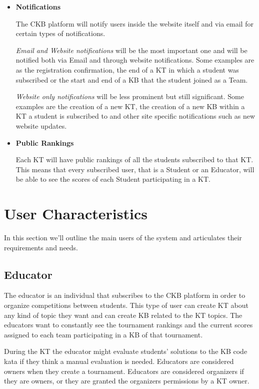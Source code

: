 \documentclass[11pt]{report}
\begin{document}
\begin{itemize}
    \item \textbf{Notifications}

    The CKB platform will notify users inside the website itself and via email for certain types of 
    notifications.

    \emph{Email and Website notifications} will be the most important one and will be notified both via Email and through website notifications.
    Some examples are as the registration confirmation, the end of a KT in which a student was subscribed
    or the start and end of a KB that the student joined as a Team.

    \emph{Website only notifications} will be less prominent but still significant.
    Some examples are the creation of a new KT, the creation of a new KB within a KT a student is subscribed to and other site
    specific notifications such as new website updates.

    \item \textbf{Public Rankings}

    Each KT will have public rankings of all the students subscribed to that KT\@.
    This means that every subscribed user, that is a Student or an Educator, will be able to see the scores of each Student
    participating in a KT\@.

\end{itemize}

\section{User Characteristics}
In this section we'll outline the main users of the system and articulates their requirements and needs.

\subsection{Educator}

The educator is an individual that subscribes to the CKB platform in order to 
organize competitions between students.
This type of user can create KT about any kind of topic they want
and can create KB related to the KT topics.
The educators want to constantly see the tournament rankings and the current
scores assigned to each team participating in a KB of that tournament.

During the KT the educator might evaluate students’ solutions to the KB
code kata if they think a manual evaluation is needed.
Educators are considered owners when they create a tournament.
Educators are considered organizers if they are owners, or they are
granted the organizers permissions by a KT owner.
\end{document}
